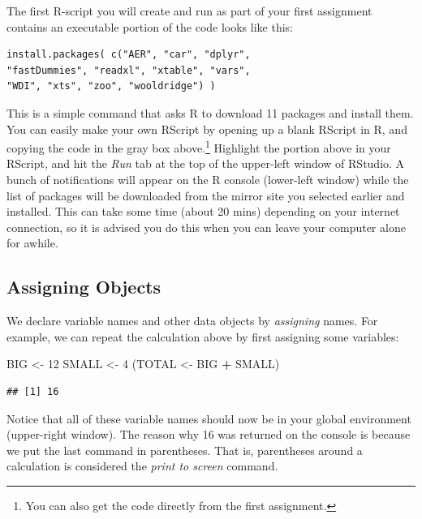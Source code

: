 \documentclass[
]{book}
\newenvironment{Shaded}{\begin{snugshade}}{\end{snugshade}}
\newcommand{\DecValTok}[1]{\textcolor[rgb]{0.00,0.00,0.81}{#1}}
\newcommand{\NormalTok}[1]{#1}
\newcommand{\OtherTok}[1]{\textcolor[rgb]{0.56,0.35,0.01}{#1}}
\newcommand{\SpecialCharTok}[1]{\textcolor[rgb]{0.81,0.36,0.00}{\textbf{#1}}}
\begin{document}
The first R-script you will create and run as part of your first assignment contains an executable portion of the code looks like this:

\begin{verbatim}
install.packages( c("AER", "car", "dplyr", 
"fastDummies", "readxl", "xtable", "vars",
"WDI", "xts", "zoo", "wooldridge") )
\end{verbatim}

This is a simple command that asks R to download 11 packages and install them. You can easily make your own RScript by opening up a blank RScript in R, and copying the code in the gray box above.\footnote{You can also get the code directly from the first assignment.} Highlight the portion above in your RScript, and hit the \emph{Run} tab at the top of the upper-left window of RStudio. A bunch of notifications will appear on the R console (lower-left window) while the list of packages will be downloaded from the mirror site you selected earlier and installed. This can take some time (about 20 mins) depending on your internet connection, so it is advised you do this when you can leave your computer alone for awhile.

\subsection{Assigning Objects}\label{assigning-objects}

We declare variable names and other data objects by \emph{assigning} names. For example, we can repeat the calculation above by first assigning some variables:

\begin{Shaded}
\begin{Highlighting}[]
\NormalTok{BIG }\OtherTok{\textless{}{-}} \DecValTok{12}
\NormalTok{SMALL }\OtherTok{\textless{}{-}} \DecValTok{4}
\NormalTok{(TOTAL }\OtherTok{\textless{}{-}}\NormalTok{ BIG }\SpecialCharTok{+}\NormalTok{ SMALL)}
\end{Highlighting}
\end{Shaded}

\begin{verbatim}
## [1] 16
\end{verbatim}

Notice that all of these variable names should now be in your global environment (upper-right window). The reason why 16 was returned on the console is because we put the last command in parentheses. That is, parentheses around a calculation is considered the \emph{print to screen} command.
\end{document}
